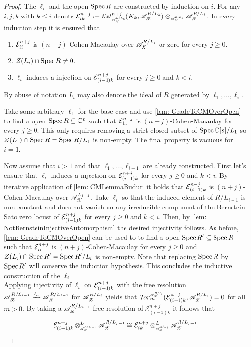 \begin{proof}
  The $\ell_i$ and the open $\operatorname{Spec} R$ are constructed by induction on $i$. For any $i,j,k$ with $k\leq i$ denote $\E_{ik}^{n+j}:= \Ex{\A_\X^{R/L_{k}} }{n+j}(K_k, \A_\X^{R/L_k}) \otimes_{\scaleto{\A_\X^{R/L_{k}}}{8pt}} \A_\X^{R/L_{i}}$.
  In every induction step it is ensured that
  \begin{enumerate}[label=(\roman*)]
    \item $\mathcal{E}_{ii}^{n+j}$ is $(n+j)$-Cohen-Macaulay over $\mathscr{A}_X^{R/L_i}$ or zero for every $j\geq 0$.
    \item $Z(L_i)\cap \operatorname{Spec} R \neq 0$.
    \item $\ell_i$ induces a injection on $\mathcal{E}_{(i-1)k}^{n+j}$
    for every $j\geq 0$ and $k<i$.
  \end{enumerate}
  By abuse of notation $L_i$ may also denote the ideal of $R$ generated by $\ell_1,\ldots,\ell_i$.

  Take some arbitrary $\ell_1$ for the base-case and use \cref{lem: GradeToCMOverOpen} to find a open $\operatorname{Spec} R \subseteq \mathbb{C}^p$ such that $\mathcal{E}^{n+j}_{11}$  is $(n+j)$-Cohen-Macaulay for every $j\geq 0$.
  This only requires removing a strict closed subset of $\operatorname{Spec} \mathbb{C}[s]/L_1$ so $Z(L_1)\cap \operatorname{Spec} R = \operatorname{Spec} R/L_1$ is non-empty.
  The final property is vacuous for $i=1$.

  Now assume that $i>1$ and that $\ell_1,\ldots, \ell_{i-1}$ are already constructed.
  First let's ensure that $\ell_i$
  induces a injection on $\mathcal{E}^{n+j}_{(i-1)k}$ for every $j\geq 0$ and $k<i$.
  By iterative application of \cref{lem: CMLemmaBudur} it holds that $\mathcal{E}^{n+j}_{(i-1)k }$
  is $(n+j)$-Cohen-Macaulay over $\mathscr{A}_{\mathscr{X}}^{L_{i-1}}$.
  Take $\ell_i$ so that the induced element of $R/L_{i-1}$ is non-constant and does not vanish on any irreducible component of the Bernstein-Sato zero locust of $\mathcal{E}^{n+j}_{(i-1)k}$ for every $j\geq 0$ and $k<i$.
  Then, by \cref{lem: NotBernsteinInjectiveAutomorphism} the desired injectivity follows.
  As before, \cref{lem: GradeToCMOverOpen} can be used to to find a open $\operatorname{Spec} R' \subseteq \operatorname{Spec} R$ such that $\mathcal{E}^{n+j}_{ii}$  is $(n+j)$-Cohen-Macaulay for every $j\geq 0$ and  $Z(L_i)\cap \operatorname{Spec} R' = \operatorname{Spec} R'/L_i$ is non-empty.
  Note that replacing $\operatorname{Spec} R$ by $\operatorname{Spec} R'$ will conserve the induction hypothesis.
  This concludes the inductive construction of the $\ell_i$.\\


  Applying injectivity of $\ell_i$ on $\mathcal{E}_{(i-1)k}^{n+j}$ with the free resolution $\mathscr{A}_{\mathscr{X}}^{R/L_{i-1}}\xrightarrow{\ell_i}\mathscr{A}_{\mathscr{X}}^{R/L_{i-1}}$ for $\mathscr{A}_{\mathscr{X}}^{R/L_i}$ yields that $\Tr{\A_\X^{R/L_i}}{m}(\E_{(i-1)k}^{n+j}, \A_\X^{R/L_i}) = 0$ for all $m>0$.
  By taking a $\mathscr{A}_{\mathscr{X}}^{R/L_{i-1}}$-free resolution of $\mathcal{E}_{(i-1)k}^{n+j}$ it follows that
  $$\mathcal{E}_{(i-1)k}^{n+j} \otimes^L_{\scaleto{\A_\X^{R/L_{i-1}}}{8pt}} \A_\X^{R/L_{p-1}} \cong  \mathcal{E}_{ik}^{n+j}  \otimes^L_{\scaleto{\A_\X^{R/L_{i}}}{8pt}}\A_\X^{R/L_{p-1}}. $$



\end{proof}

